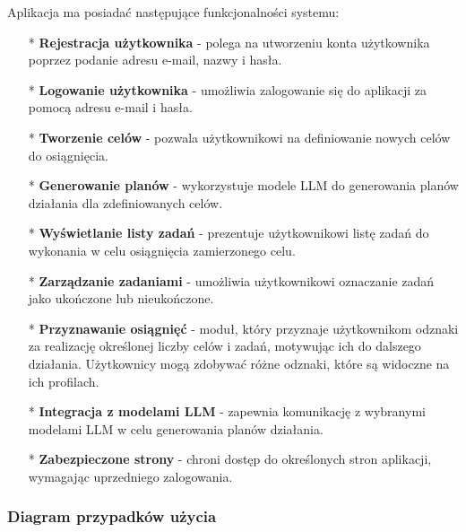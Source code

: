 \noindent Aplikacja ma posiadać następujące funkcjonalności systemu:
\begin{enumerate}
    \item[*] {\bf Rejestracja użytkownika} - polega na utworzeniu konta użytkownika poprzez podanie adresu e-mail, nazwy i hasła.
    \item[*] {\bf Logowanie użytkownika} - umożliwia zalogowanie się do aplikacji za pomocą adresu e-mail i hasła.
    \item[*] {\bf Tworzenie celów} - pozwala użytkownikowi na definiowanie nowych celów do osiągnięcia.
    \item[*] {\bf Generowanie planów} - wykorzystuje modele LLM do generowania planów działania dla zdefiniowanych celów.
    \item[*] {\bf Wyświetlanie listy zadań} - prezentuje użytkownikowi listę zadań do wykonania w celu osiągnięcia zamierzonego celu.
    \item[*] {\bf Zarządzanie zadaniami} - umożliwia użytkownikowi oznaczanie zadań jako ukończone lub nieukończone.
    \item[*] {\bf Przyznawanie osiągnięć} - moduł, który przyznaje użytkownikom odznaki za realizację określonej liczby celów i zadań, motywując ich do dalszego działania. Użytkownicy mogą zdobywać różne odznaki, które są widoczne na ich profilach.
    \item[*] {\bf Integracja z modelami LLM} - zapewnia komunikację z wybranymi modelami LLM w celu generowania planów działania.
    \item[*] {\bf Zabezpieczone strony} - chroni dostęp do określonych stron aplikacji, wymagając uprzedniego zalogowania.
\end{enumerate}

\clearpage

\subsubsection{Diagram przypadków użycia}

